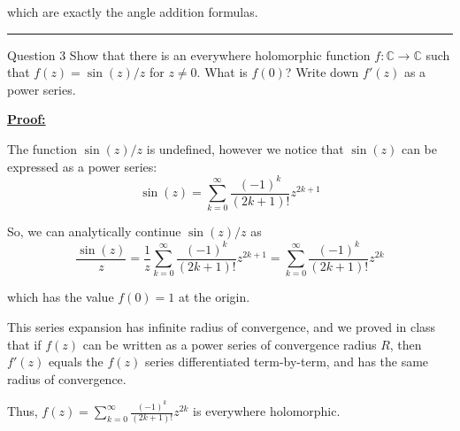\documentclass{article}
\newcommand{\C}{\mathbb{C}}
\begin{document}
which are exactly the angle addition formulas.

\vskip 0.5cm
\hrule 
\vskip 0.5cm

\begin{mathdefinitionbox}{Question 3}
\vskip 0.5cm
Show that there is an everywhere holomorphic function $f:\C \rightarrow \C$ such that $f(z) = \sin(z)/z $ for $z\neq0$. What is $f(0)$? Write down $f'(z)$ as a power series.
\end{mathdefinitionbox}

\vskip 0.5cm
\underline{\textbf{Proof:}}

\vskip 0.5cm



The function $\sin(z)/z$ is undefined, however we notice that $\sin(z)$ can be expressed as a power series:
\[ \sin(z) = \sum_{k = 0}^{\infty} \frac{(-1)^k}{(2k+1)!}z^{2k+1} \]

So, we can analytically continue $\sin(z)/z$ as 
\[ \frac{\sin(z)}{z} =  \frac{1}{z} \sum_{k = 0}^{\infty} \frac{(-1)^k}{(2k+1)!}z^{2k+1} = \sum_{k = 0}^{\infty} \frac{(-1)^k}{(2k+1)!}z^{2k} \] 

which has the value $f(0) = 1$ at the origin.

\vskip 0.5cm
This series expansion has infinite radius of convergence, and we proved in class that if $f(z)$ can be written as a power series of convergence radius $R$, then $f'(z)$ equals the $f(z)$ series differentiated term-by-term, and has the same radius of convergence. 

\vskip 0.5cm
Thus, $f(z) = \sum_{k = 0}^{\infty} \frac{(-1)^k}{(2k+1)!}z^{2k}$ is everywhere holomorphic.
\end{document}
